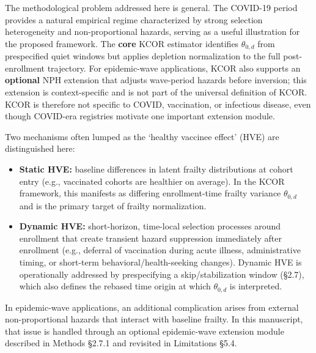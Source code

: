 \documentclass[
]{article}
\begin{document}
The methodological problem addressed here is general. The COVID-19
period provides a natural empirical regime characterized by strong
selection heterogeneity and non-proportional hazards, serving as a
useful illustration for the proposed framework. The \textbf{core} KCOR
estimator identifies \(\theta_{0,d}\) from prespecified quiet windows
but applies depletion normalization to the full post-enrollment
trajectory. For epidemic-wave applications, KCOR also supports an
\textbf{optional} NPH extension that adjusts wave-period hazards before
inversion; this extension is context-specific and is not part of the
universal definition of KCOR. KCOR is therefore not specific to COVID,
vaccination, or infectious disease, even though COVID-era registries
motivate one important extension module.

Two mechanisms often lumped as the `healthy vaccinee effect' (HVE) are
distinguished here:

\begin{itemize}
\item
  \textbf{Static HVE:} baseline differences in latent frailty
  distributions at cohort entry (e.g., vaccinated cohorts are healthier
  on average). In the KCOR framework, this manifests as differing
  enrollment-time frailty variance \(\theta_{0,d}\) and is the primary
  target of frailty normalization.
\item
  \textbf{Dynamic HVE:} short-horizon, time-local selection processes
  around enrollment that create transient hazard suppression immediately
  after enrollment (e.g., deferral of vaccination during acute illness,
  administrative timing, or short-term behavioral/health-seeking
  changes). Dynamic HVE is operationally addressed by prespecifying a
  skip/stabilization window (§2.7), which also defines the rebased time
  origin at which \(\theta_{0,d}\) is interpreted.
\end{itemize}

In epidemic-wave applications, an additional complication arises from
external non-proportional hazards that interact with baseline frailty.
In this manuscript, that issue is handled through an optional
epidemic-wave extension module described in Methods §2.7.1 and revisited
in Limitations §5.4.
\end{document}
